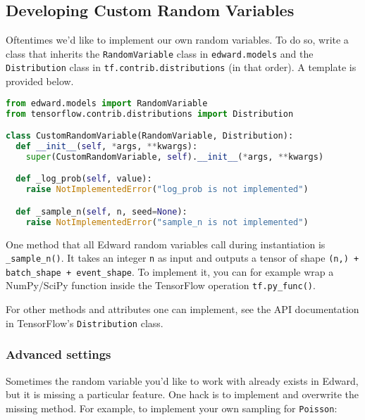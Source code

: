 \subsection*{Developing Custom Random Variables}

Oftentimes we'd like to implement our own random variables.
To do so, write a class that inherits
the \texttt{RandomVariable} class in \texttt{edward.models} and
the \texttt{Distribution} class in \texttt{tf.contrib.distributions} (in that
order). A template is provided below.

\begin{lstlisting}[language=Python]
from edward.models import RandomVariable
from tensorflow.contrib.distributions import Distribution

class CustomRandomVariable(RandomVariable, Distribution):
  def __init__(self, *args, **kwargs):
    super(CustomRandomVariable, self).__init__(*args, **kwargs)

  def _log_prob(self, value):
    raise NotImplementedError("log_prob is not implemented")

  def _sample_n(self, n, seed=None):
    raise NotImplementedError("sample_n is not implemented")
\end{lstlisting}

One method that all Edward random variables call during instantiation is
\texttt{_sample_n()}.
It takes an integer \texttt{n} as input and outputs a tensor of shape
\texttt{(n,) + batch_shape + event_shape}.
To implement it, you can for example wrap a NumPy/SciPy function
inside the TensorFlow operation \texttt{tf.py_func()}.

For other methods and attributes one can implement, see the API documentation in
TensorFlow's
\texttt{Distribution} class.

\subsubsection{Advanced settings}

Sometimes the random variable you'd like to work with already exists
in Edward, but it is missing a particular feature. One hack is to
implement and overwrite the missing method. For example, to implement
your own sampling for \texttt{Poisson}:

